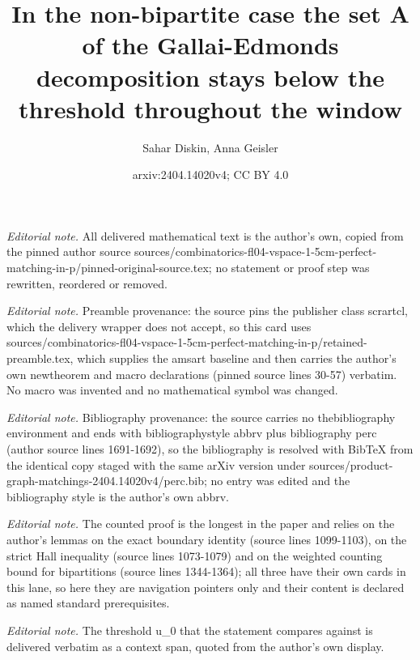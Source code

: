 \documentclass[10pt,a4paper]{amsart}
\title{In the non-bipartite case the set A of the Gallai-Edmonds decomposition stays below the threshold throughout the window}
\author{Sahar Diskin, Anna Geisler}
\date{arxiv:2404.14020v4; CC BY 4.0}
\begin{document}
\maketitle
\noindent\textit{Editorial note.} All delivered mathematical text is the author's own, copied from the pinned author source sources/combinatorics-fl04-vspace-1-5cm-perfect-matching-in-p/pinned-original-source.tex; no statement or proof step was rewritten, reordered or removed.\par\medskip
\noindent\textit{Editorial note.} Preamble provenance: the source pins the publisher class scrartcl, which the delivery wrapper does not accept, so this card uses sources/combinatorics-fl04-vspace-1-5cm-perfect-matching-in-p/retained-preamble.tex, which supplies the amsart baseline and then carries the author's own newtheorem and macro declarations (pinned source lines 30-57) verbatim. No macro was invented and no mathematical symbol was changed.\par\medskip
\noindent\textit{Editorial note.} Bibliography provenance: the source carries no thebibliography environment and ends with bibliographystyle abbrv plus bibliography perc (author source lines 1691-1692), so the bibliography is resolved with BibTeX from the identical copy staged with the same arXiv version under sources/product-graph-matchings-2404.14020v4/perc.bib; no entry was edited and the bibliography style is the author's own abbrv.\par\medskip
\noindent\textit{Editorial note.} The counted proof is the longest in the paper and relies on the author's lemmas on the exact boundary identity (source lines 1099-1103), on the strict Hall inequality (source lines 1073-1079) and on the weighted counting bound for bipartitions (source lines 1344-1364); all three have their own cards in this lane, so here they are navigation pointers only and their content is declared as named standard prerequisites.\par\medskip
\noindent\textit{Editorial note.} The threshold u\_0 that the statement compares against is delivered verbatim as a context span, quoted from the author's own display.\par\medskip
\end{document}
